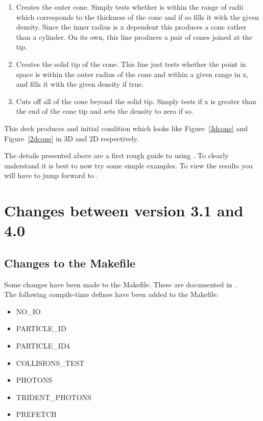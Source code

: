 \begin{enumerate}
\item Creates the outer cone. Simply tests whether  is within
  the range of radii which corresponds to the thickness of the cone and if so
  fills it with the given density. Since the inner radius is x dependent this
  produces a cone rather than a cylinder. On its own, this line produces a
  pair of cones joined at the tip.
\item Creates the solid tip of the cone. This line just tests whether the
  point in space is within the outer radius of the cone and within a given
  range in x, and fills it with the given density if true.
\item Cuts off all of the cone beyond the solid tip. Simply tests if x is
  greater than the end of the cone tip and sets the density to zero if so.
\end{enumerate}


This deck produces and initial condition which looks like Figure~\ref{3dcone}
and Figure~\ref{2dcone} in 3D and 2D respectively.

The details presented above are a first rough guide to using {\EPOCH}. To
clearly understand {\EPOCH} it is best to now try some simple examples. To
view the results you will have to jump forward to .



\appendix
\section{Changes between version 3.1 and 4.0}

\subsection{Changes to the Makefile}

Some changes have been made to the Makefile. These are documented in
.\\

\noindent The following compile-time defines have been added to the Makefile:
\begin{itemize}
\item NO\_IO
\item PARTICLE\_ID
\item PARTICLE\_ID4
\item COLLISIONS\_TEST
\item PHOTONS
\item TRIDENT\_PHOTONS
\item PREFETCH
\end{itemize}
\bigskip

